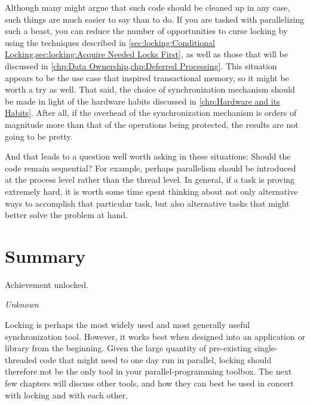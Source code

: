Although many might argue that such code should be cleaned up in any
case, such things are much easier to say than to do.
If you are tasked with parallelizing such a beast, you can reduce the
number of opportunities to curse locking by using the techniques
described in
\cref{sec:locking:Conditional Locking,sec:locking:Acquire Needed Locks First},
as well as those that will be discussed in
\cref{chp:Data Ownership,chp:Deferred Processing}.
This situation appears to be the use case that inspired transactional
memory, so it might be worth a try as well.
That said, the choice of synchronization mechanism should be made in
light of the hardware habits discussed in
\cref{chp:Hardware and its Habits}.
After all, if the overhead of the synchronization mechanism is orders of
magnitude more than that of the operations being protected, the results
are not going to be pretty.

And that leads to a question well worth asking in these situations:
Should the code remain sequential?
For example, perhaps parallelism should be introduced at the process level
rather than the thread level.
In general, if a task is proving extremely hard, it is worth some time
spent thinking about not only alternative ways to accomplish that
particular task, but also alternative tasks that might better solve
the problem at hand.

\section{Summary}
\label{sec:locking:Summary}
%
\epigraph{Achievement unlocked.}{\emph{Unknown}}

Locking is perhaps the most widely used and most generally useful
synchronization tool.
However, it works best when designed into an application
or library from the beginning.
Given the large quantity of pre-existing single-threaded code that might
need to one day run in parallel, locking should therefore not be the
only tool in your parallel-programming toolbox.
The next few chapters will discuss other tools, and how they can best
be used in concert with locking and with each other.

